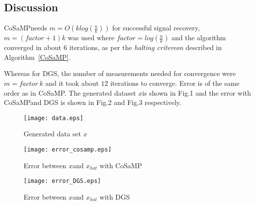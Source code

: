 \documentclass[12pt]{article}
\theoremstyle{definition}
\def\x{$x$\hspace{0.1in}}
\def\cosamp{CoSaMP\hspace{0.1in}}
\begin{document}
  \subsection{Discussion}
  \cosamp needs $m=O(klog(\frac{n}{k}))$ for successful signal recovery, $m=(factor+1)k$ was used where
  $factor=log(\frac{n}{k})$ and the algorithm converged in about $6$ iterations, as per the \textit{halting critereon}
  described in Algorithm~\ref{CoSaMP}. 
  \par Whereas for DGS, the number of measurements needed for convergence were $m=factor \ k$ and
  it took about $12$ iterations to converge. Error is of the same order as in \cosamp.
  The generated dataset \x is shown in Fig.1
  and the error with \cosamp and DGS is shown in Fig.2 and 
  Fig.3 respectively.\\
  \begin{figure}[H]
  \label{fig:dataset}
	\begin{center}
	\texttt{[image: data.eps]}
	\caption{Generated data set \x} 
	\end{center}
	
\end{figure}
\begin{figure}[H]
	\begin{center}
	\texttt{[image: error\_cosamp.eps]}
	\caption{Error between \x and $x_{hat}$ with CoSaMP} 
	\end{center}
	\label{fig:error_cosamp}
\end{figure}
\begin{figure}[H]
	\begin{center}
	\texttt{[image: error\_DGS.eps]}
	\caption{Error between \x and $x_{hat}$ with DGS}
	\end{center}
	\label{fig:error_dgs}
\end{figure}
\end{document}
